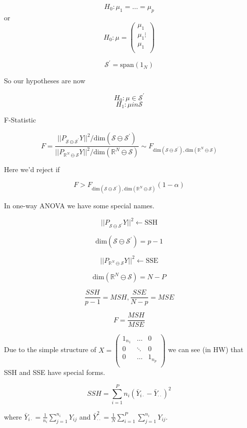\documentclass[11pt,fleqn]{book} %
\begin{document}
		$$H_0: \mu_1 = \dots = \mu_p $$
or
		$$H_0: \mu = \begin{pmatrix}
			\mu_1\\
			\mu_1
			\vdots\\
			\mu_1\\
		\end{pmatrix}  $$


		$$\mathcal{S}^\prime = \text{span}(1_N) $$


So our hypotheses are now 

		$$H_0: \mu \in \mathcal{S}^\prime$$
		$$H_1: \mu in \mathcal{S} $$


F-Statistic

		$$F = \frac{||P_{\mathcal{S} \ominus \mathcal{S}^\prime} Y||^2 / \text{dim}(\mathcal{S} \ominus \mathcal{S}^\prime)}{||P_{\mathbb{R}^N \ominus \mathcal{S}} Y||^2 / \text{dim}(\mathbb{R}^N \ominus \mathcal{S})} \sim F_{\text{dim}(\mathcal{S} \ominus \mathcal{S}^\prime), \text{dim}(\mathbb{R}^N \ominus \mathcal{S})} $$

Here we'd reject if

		$$F > F_{\text{dim}(\mathcal{S} \ominus \mathcal{S}^\prime), \text{dim}(\mathbb{R}^N \ominus \mathcal{S})} (1 - \alpha) $$


In one-way ANOVA we have some special names. 

		$$ ||P_{\mathcal{S} \ominus \mathcal{S}^\prime} Y||^2 \leftarrow \text{SSH}$$

		$$ \text{dim}(\mathcal{S} \ominus \mathcal{S}^\prime) = p - 1 $$

		$$||P_{\mathbb{R}^N \ominus \mathcal{S}} Y||^2 \leftarrow \text{SSE} $$

		$$ \text{dim}(\mathbb{R}^N \ominus \mathcal{S}) = N-P $$

		$$\frac{SSH}{p-1} = MSH, \frac{SSE}{N-p} = MSE $$

		$$ F = \frac{MSH}{MSE}$$

Due to the simple structure of $X = \begin{pmatrix}
	1_{n_1} & \dots & 0 \\
			0 & \ddots &  0 \\
			0 & \dots & 1_{n_p}\\
\end{pmatrix}$ we can see (in HW) that SSH and SSE have special forms. 


 $$SSH = \displaystyle \sum^P_{i =1} n_i (\bar{Y}_{i\cdot} - \bar{Y}_{\cdot\cdot})^2$$

 where $\bar{Y}_{i \cdot} = \frac{1}{n_i} \displaystyle \sum^{n_i}_{j=1} Y_{ij}$ and $\bar{Y}_{\cdot \cdot} ^2= \frac{1}{N} \displaystyle \sum^P_{i = 1} \sum^{n_i}_{j=1} Y_{ij}$. \\
\end{document}
